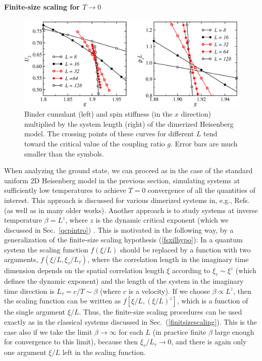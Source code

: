 \documentclass[draft,numberedheadings]{aipproc}
\begin{document}
\paragraph{Finite-size scaling for $T \to 0$}

\begin{figure}
\includegraphics[width=13.5cm, clip]{dimbindrho.eps}
\caption{Binder cumulant (left) and spin stiffness (in the $x$ direction) multiplied by the system length (right) of the dimerized Heisenberg 
model. The crossing points of these curves for different $L$ tend toward the critical value of the coupling ratio $g$. Error bars are much smaller 
than the symbols.}
\label{dimbindrho}
\end{figure}

When analyzing the ground state, we can proceed as in the case of the standard uniform 2D Heisenberg model in the previous section, simulating systems
at sufficiently low temperatures to achieve $T=0$ convergence of all the quantities of interest. This approach is discussed for various dimerized
systems in, e.g., Refs.~\cite{wang,wenzel1} (as well as in many older works). Another approach is to study systems at inverse temperature $\beta=L^z$, 
where $z$ is the dynamic critical exponent (which we discussed in Sec.~\ref{qcpintro}) \cite{krauth}. This is motivated in the following way, by a generalization 
of the finite-size scaling hypothesis (\ref{fsxilhypo}): In a quantum system the scaling function $f(\xi/L)$ should be replaced by a function with 
two arguments, $f(\xi/L,\xi_\tau/L_\tau)$, where the correlation length in the imaginary time dimension depends on the spatial correlation length 
$\xi$ according to $\xi_\tau \sim \xi^z$ (which defines the dynamic exponent) and the length of the system in the imaginary time direction is 
$L_\tau=c/T\sim \beta$ (where $c$ is a velocity). If we choose $\beta \propto L^z$, then the scaling function can be written as $f[\xi/L,(\xi/L)^z]$, 
which is a function of the single argument $\xi/L$. Thus, the finite-size scaling procedures can be used exactly as in the classical systems discussed 
in Sec.~(\ref{finitsizescaling}). This is the case also if we take the limit $\beta \to \infty$ for each $L$ (in practice finite $\beta$ large enough 
for convergence to this limit), because then $\xi_\tau/L_\tau \to 0$, and there is again only one argument $\xi/L$ left in the scaling function.
\end{document}

